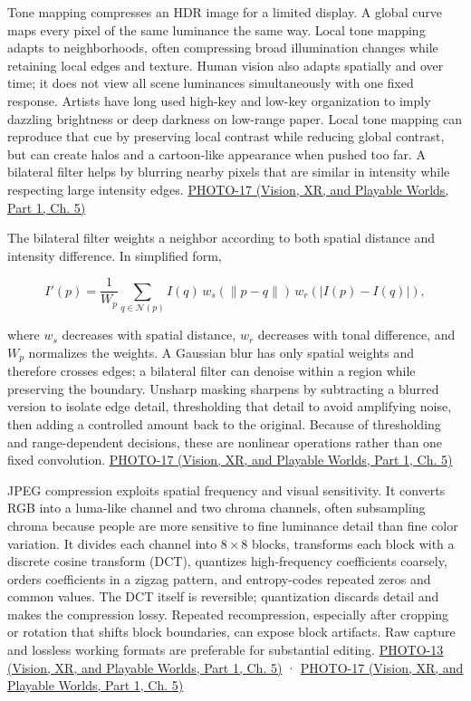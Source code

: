 Tone mapping compresses an HDR image for a limited display. A global curve maps every pixel of the same luminance the same way. Local tone mapping adapts to neighborhoods, often compressing broad illumination changes while retaining local edges and texture. Human vision also adapts spatially and over time; it does not view all scene luminances simultaneously with one fixed response. Artists have long used high-key and low-key organization to imply dazzling brightness or deep darkness on low-range paper. Local tone mapping can reproduce that cue by preserving local contrast while reducing global contrast, but can create halos and a cartoon-like appearance when pushed too far. A bilateral filter helps by blurring nearby pixels that are similar in intensity while respecting large intensity edges. \href{../07-Vision-XR-and-Playable-Worlds-P01/main.pdf\#nameddest=04-visual-computing-ii-ch036-photo-17---photography-session-17}{PHOTO-17 (Vision, XR, and Playable Worlds, Part 1, Ch. 5)}

The bilateral filter weights a neighbor according to both spatial distance and intensity difference. In simplified form,

\[
I'(p)=\frac{1}{W_p}\sum_{q\in\mathcal N(p)} I(q)\,w_s(\|p-q\|)\,w_r(|I(p)-I(q)|),
\]

where \(w_s\) decreases with spatial distance, \(w_r\) decreases with tonal difference, and \(W_p\) normalizes the weights. A Gaussian blur has only spatial weights and therefore crosses edges; a bilateral filter can denoise within a region while preserving the boundary. Unsharp masking sharpens by subtracting a blurred version to isolate edge detail, thresholding that detail to avoid amplifying noise, then adding a controlled amount back to the original. Because of thresholding and range-dependent decisions, these are nonlinear operations rather than one fixed convolution. \href{../07-Vision-XR-and-Playable-Worlds-P01/main.pdf\#nameddest=04-visual-computing-ii-ch036-photo-17---photography-session-17}{PHOTO-17 (Vision, XR, and Playable Worlds, Part 1, Ch. 5)}

JPEG compression exploits spatial frequency and visual sensitivity. It converts RGB into a luma-like channel and two chroma channels, often subsampling chroma because people are more sensitive to fine luminance detail than fine color variation. It divides each channel into \(8\times8\) blocks, transforms each block with a discrete cosine transform (DCT), quantizes high-frequency coefficients coarsely, orders coefficients in a zigzag pattern, and entropy-codes repeated zeros and common values. The DCT itself is reversible; quantization discards detail and makes the compression lossy. Repeated recompression, especially after cropping or rotation that shifts block boundaries, can expose block artifacts. Raw capture and lossless working formats are preferable for substantial editing. \href{../07-Vision-XR-and-Playable-Worlds-P01/main.pdf\#nameddest=04-visual-computing-ii-ch036-photo-13---photography-session-13}{PHOTO-13 (Vision, XR, and Playable Worlds, Part 1, Ch. 5)} · \href{../07-Vision-XR-and-Playable-Worlds-P01/main.pdf\#nameddest=04-visual-computing-ii-ch036-photo-17---photography-session-17}{PHOTO-17 (Vision, XR, and Playable Worlds, Part 1, Ch. 5)}

